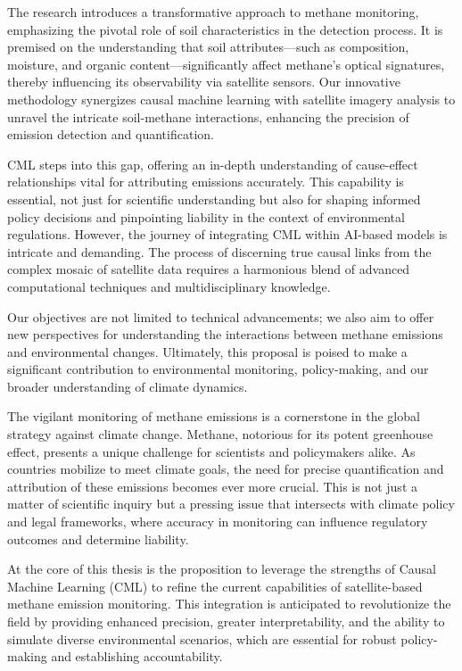 The research introduces a transformative approach to methane monitoring, emphasizing the pivotal role of soil characteristics in the detection process. It is premised on the understanding that soil attributes—such as composition, moisture, and organic content—significantly affect methane's optical signatures, thereby influencing its observability via satellite sensors. Our innovative methodology synergizes causal machine learning with satellite imagery analysis to unravel the intricate soil-methane interactions, enhancing the precision of emission detection and quantification.

CML steps into this gap, offering an in-depth understanding of cause-effect relationships vital for attributing emissions accurately. This capability is essential, not just for scientific understanding but also for shaping informed policy decisions and pinpointing liability in the context of environmental regulations. However, the journey of integrating CML within AI-based models is intricate and demanding. The process of discerning true causal links from the complex mosaic of satellite data requires a harmonious blend of advanced computational techniques and multidisciplinary knowledge.

Our objectives are not limited to technical advancements; we also aim to offer new perspectives for understanding the interactions between methane emissions and environmental changes. Ultimately, this proposal is poised to make a significant contribution to environmental monitoring, policy-making, and our broader understanding of climate dynamics.

The vigilant monitoring of methane emissions is a cornerstone in the global strategy against climate change. Methane, notorious for its potent greenhouse effect, presents a unique challenge for scientists and policymakers alike. As countries mobilize to meet climate goals, the need for precise quantification and attribution of these emissions becomes ever more crucial. This is not just a matter of scientific inquiry but a pressing issue that intersects with climate policy and legal frameworks, where accuracy in monitoring can influence regulatory outcomes and determine liability.

At the core of this thesis is the proposition to leverage the strengths of Causal Machine Learning (CML)  to refine the current capabilities of satellite-based methane emission monitoring. This integration is anticipated to revolutionize the field by providing enhanced precision, greater interpretability, and the ability to simulate diverse environmental scenarios, which are essential for robust policy-making and establishing accountability.


